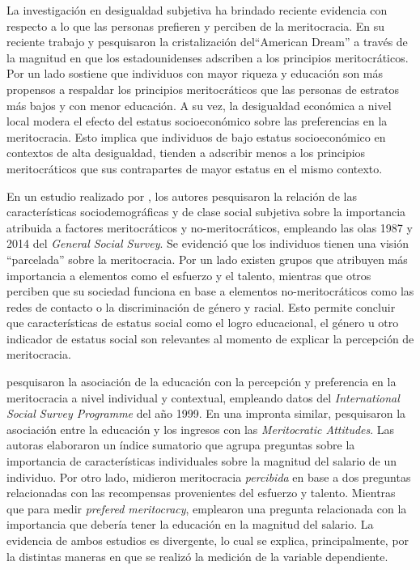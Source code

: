 \documentclass[12pt]{article}
\begin{document}
La investigación en desigualdad subjetiva ha brindado reciente evidencia con respecto a lo que las personas prefieren y perciben de la meritocracia. En su reciente trabajo \citet{Newman2015} y \citet{Solt2016} pesquisaron la cristalización del``American Dream'' a través de la magnitud en que los estadounidenses adscriben a los principios meritocráticos. Por un lado \citet{Newman2015} sostiene que individuos con mayor riqueza y educación son más propensos a respaldar los principios meritocráticos que las personas de estratos más bajos y con menor educación. A su vez, la desigualdad económica a nivel local modera el efecto del estatus socioeconómico sobre las preferencias en la meritocracia. Esto implica que individuos de bajo estatus socioeconómico en contextos de alta desigualdad, tienden a adscribir menos a los principios meritocráticos que sus contrapartes de mayor estatus en el mismo contexto. 

En un estudio realizado por \citet{Reynolds2014}, los autores pesquisaron la relación de las características sociodemográficas y de clase social subjetiva sobre la importancia atribuida a factores meritocráticos y no-meritocráticos, empleando las olas 1987 y 2014 del \textit{General Social Survey}. Se evidenció que los individuos tienen una visión ``parcelada'' sobre la meritocracia. Por un lado existen grupos que atribuyen más importancia a elementos como el esfuerzo y el talento, mientras que otros perciben que su sociedad funciona en base a elementos no-meritocráticos como las redes de contacto o la discriminación de género y racial. Esto permite concluir que características de estatus social como el logro educacional, el género u otro indicador de estatus social son relevantes al momento de explicar la percepción de meritocracia.

\citet{Duru-bellat2012} pesquisaron la asociación de la educación con la percepción y preferencia en la meritocracia a nivel individual y contextual, empleando datos del \textit{International Social Survey Programme} del año 1999. En una impronta similar, \citet{Kunovich2007} pesquisaron la asociación entre la educación y los ingresos con las \textit{Meritocratic Attitudes}. Las autoras elaboraron un índice sumatorio que agrupa preguntas sobre la importancia de características individuales sobre la magnitud del salario de un individuo. Por otro lado, \citet{Duru-bellat2012} midieron meritocracia \textit{percibida} en base a dos preguntas relacionadas con las recompensas provenientes del esfuerzo y talento. Mientras que para medir \textit{prefered meritocracy}, emplearon una pregunta relacionada con la importancia que debería tener la educación en la magnitud del salario. La evidencia de ambos estudios es divergente, lo cual se explica, principalmente, por la distintas maneras en que se realizó la medición de la variable dependiente. 
\end{document}
